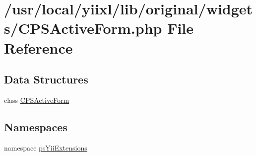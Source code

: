 \hypertarget{CPSActiveForm_8php}{
\section{/usr/local/yiixl/lib/original/widgets/CPSActiveForm.php File Reference}
\label{CPSActiveForm_8php}
}
\subsection*{Data Structures}
\begin{DoxyCompactItemize}
\item 
class \hyperlink{classCPSActiveForm}{CPSActiveForm}
\end{DoxyCompactItemize}
\subsection*{Namespaces}
\begin{DoxyCompactItemize}
\item 
namespace \hyperlink{namespacepsYiiExtensions}{psYiiExtensions}
\end{DoxyCompactItemize}
